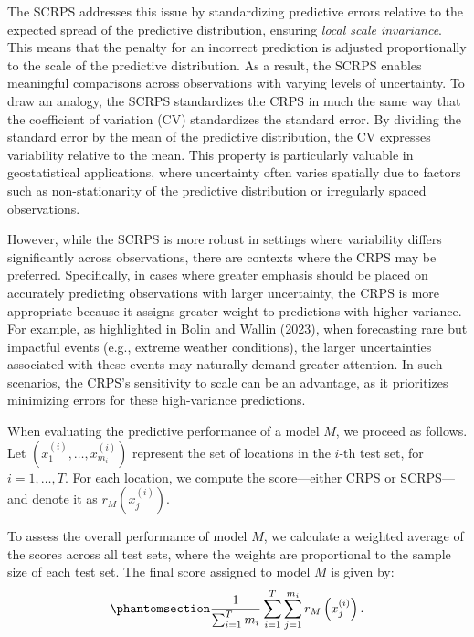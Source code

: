 \documentclass[
  letterpaper,
]{krantz}
\begin{document}
The SCRPS addresses this issue by standardizing predictive errors
relative to the expected spread of the predictive distribution, ensuring
\emph{local scale invariance}. This means that the penalty for an
incorrect prediction is adjusted proportionally to the scale of the
predictive distribution. As a result, the SCRPS enables meaningful
comparisons across observations with varying levels of uncertainty. To
draw an analogy, the SCRPS standardizes the CRPS in much the same way
that the coefficient of variation (CV) standardizes the standard error.
By dividing the standard error by the mean of the predictive
distribution, the CV expresses variability relative to the mean. This
property is particularly valuable in geostatistical applications, where
uncertainty often varies spatially due to factors such as
non-stationarity of the predictive distribution or irregularly spaced
observations.

However, while the SCRPS is more robust in settings where variability
differs significantly across observations, there are contexts where the
CRPS may be preferred. Specifically, in cases where greater emphasis
should be placed on accurately predicting observations with larger
uncertainty, the CRPS is more appropriate because it assigns greater
weight to predictions with higher variance. For example, as highlighted
in Bolin and Wallin (2023), when forecasting rare but impactful events
(e.g., extreme weather conditions), the larger uncertainties associated
with these events may naturally demand greater attention. In such
scenarios, the CRPS's sensitivity to scale can be an advantage, as it
prioritizes minimizing errors for these high-variance predictions.

When evaluating the predictive performance of a model \(M\), we proceed
as follows. Let \(\left(x_{1}^{(i)}, \ldots, x_{m_i}^{(i)}\right)\)
represent the set of locations in the \(i\)-th test set, for
\(i=1, \ldots, T\). For each location, we compute the score---either
CRPS or SCRPS---and denote it as \(r_{M}\left(x_{j}^{(i)}\right)\).

To assess the overall performance of model \(M\), we calculate a
weighted average of the scores across all test sets, where the weights
are proportional to the sample size of each test set. The final score
assigned to model \(M\) is given by:
\begin{equation}\phantomsection\label{eq-average-score}{
\frac{1}{\sum_{i=1}^T m_i} \sum_{i=1}^{T} \sum_{j=1}^{m_i} r_{M}\left(x_{j}^{(i)}\right). }\end{equation}
\end{document}

